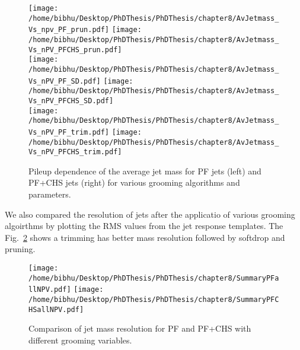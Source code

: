 \begin{figure}[h]
\centering
\texttt{[image: /home/bibhu/Desktop/PhDThesis/PhDThesis/chapter8/AvJetmass\_Vs\_npv\_PF\_prun.pdf]}
\texttt{[image: /home/bibhu/Desktop/PhDThesis/PhDThesis/chapter8/AvJetmass\_Vs\_nPV\_PFCHS\_prun.pdf]}\\
\texttt{[image: /home/bibhu/Desktop/PhDThesis/PhDThesis/chapter8/AvJetmass\_Vs\_nPV\_PF\_SD.pdf]}
\texttt{[image: /home/bibhu/Desktop/PhDThesis/PhDThesis/chapter8/AvJetmass\_Vs\_nPV\_PFCHS\_SD.pdf]}\\
\texttt{[image: /home/bibhu/Desktop/PhDThesis/PhDThesis/chapter8/AvJetmass\_Vs\_nPV\_PF\_trim.pdf]}
\texttt{[image: /home/bibhu/Desktop/PhDThesis/PhDThesis/chapter8/AvJetmass\_Vs\_nPV\_PFCHS\_trim.pdf]}\\
\caption{Pileup dependence of the average jet mass for PF jets (left) and PF+CHS jets (right) for various grooming algorithms and parameters.}
\label{fig:grooming_PFvCHS}
\end{figure}


We also compared the resolution of jets after the applicatio of various grooming algoirthms by plotting the RMS values from the jet response templates. The Fig.~\ref{fig:summary_all_groomer_QCD} shows a trimming has better mass resolution followed by softdrop and pruning.



\begin{figure}[h]
\centering
\texttt{[image: /home/bibhu/Desktop/PhDThesis/PhDThesis/chapter8/SummaryPFallNPV.pdf]}
\texttt{[image: /home/bibhu/Desktop/PhDThesis/PhDThesis/chapter8/SummaryPFCHSallNPV.pdf]}\\
\caption{Comparison of jet mass resolution for PF and PF+CHS  with different grooming variables.}
\label{fig:summary_all_groomer_QCD}
\end{figure}
















